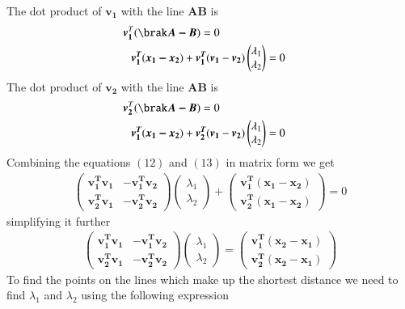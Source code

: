 \documentclass[journal,12pt,twocolumn]{IEEEtran}
\begin{document}
The dot product of $\bm{v_1}$ with the line $\bm{AB}$ is
\begin{align}
    \bm{v_1}^T(\brak\bm{A-B})=0\notag\\
    \bm{v_1^T}(\bm{x_1-x_2})+\bm{v_1^T}(\bm{v_1} & -\bm{v_2})\begin{pmatrix}\lambda_1 \\ \lambda_2\end{pmatrix}=0
\end{align}
The dot product of $\bm{v_2}$ with the line $\bm{AB}$ is\\
\begin{align}
    \bm{v_2}^T(\brak\bm{A-B})=0\notag\\
    \bm{v_1^T}(\bm{x_1-x_2})+\bm{v_2^T}(\bm{v_1} & -\bm{v_2})\begin{pmatrix}\lambda_1 \\ \lambda_2\end{pmatrix}=0
\end{align}
Combining the equations $(12)$ and $(13)$ in matrix form we get\\
\begin{align}
    \begin{pmatrix}\bm{v_1^T}\bm{v_1} & -\bm{v_1^T}\bm{v_2}\\\bm{v_2^T}\bm{v_1} &  -\bm{v_2^T}\bm{v_2}\end{pmatrix}\begin{pmatrix}\lambda_1\\\lambda_2\end{pmatrix}+\begin{pmatrix}\bm{v_1^T}\bm{(x_1-x_2)}\\\bm{v_2^T}\bm{(x_1-x_2)}\end{pmatrix}=0
\end{align}
simplifying it further\\
\begin{align}
    \begin{pmatrix}\bm{v_1^T}\bm{v_1} & -\bm{v_1^T}\bm{v_2}\\\bm{v_2^T}\bm{v_1} &  -\bm{v_2^T}\bm{v_2}\end{pmatrix}\begin{pmatrix}\lambda_1\\\lambda_2\end{pmatrix}=\begin{pmatrix}\bm{v_1^T}\bm{(x_2-x_1)}\\\bm{v_2^T}\bm{(x_2-x_1)}\end{pmatrix}
\end{align}
To find the points on the lines which make up the shortest distance we need to find $\lambda_1$ and $\lambda_2$ using the following expression\\
\end{document}

